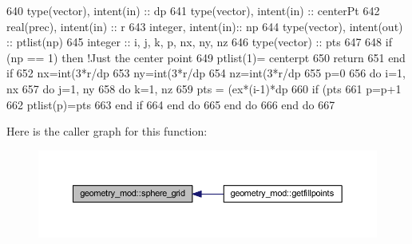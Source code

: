 \begin{DoxyCode}
640     \textcolor{keywordtype}{type}(vector), \textcolor{keywordtype}{intent(in)} :: dp
641     \textcolor{keywordtype}{type}(vector), \textcolor{keywordtype}{intent(in)} :: centerPt
642     \textcolor{keywordtype}{real(prec)}, \textcolor{keywordtype}{intent(in)} :: r
643     \textcolor{keywordtype}{integer}, \textcolor{keywordtype}{intent(in)}::  np
644     \textcolor{keywordtype}{type}(vector), \textcolor{keywordtype}{intent(out)} :: ptlist(np)
645     \textcolor{keywordtype}{integer} :: i, j, k, p, nx, ny, nz
646     \textcolor{keywordtype}{type}(vector) :: pts
647 
648     \textcolor{keywordflow}{if} (np == 1) \textcolor{keywordflow}{then} \textcolor{comment}{!Just the center point}
649         ptlist(1)= centerpt
650         \textcolor{keywordflow}{return}
651 \textcolor{keywordflow}{    end if}
652     nx=int(3*r/dp%
653     ny=int(3*r/dp%
654     nz=int(3*r/dp%
655     p=0
656     \textcolor{keywordflow}{do} i=1, nx
657         \textcolor{keywordflow}{do} j=1, ny
658             \textcolor{keywordflow}{do} k=1, nz
659                 pts = (ex*(i-1)*dp%
660                 \textcolor{keywordflow}{if} (pts%
661                     p=p+1
662                     ptlist(p)=pts
663 \textcolor{keywordflow}{                end if}
664 \textcolor{keywordflow}{            end do}
665 \textcolor{keywordflow}{        end do}
666 \textcolor{keywordflow}{    end do}
667 
\end{DoxyCode}
Here is the caller graph for this function\+:\nopagebreak
\begin{figure}[H]
\begin{center}
\leavevmode
\includegraphics[width=350pt]{namespacegeometry__mod_a9b4ea4b26bc4f50dbfa3ba8b1d3fb2f2_icgraph}
\end{center}
\end{figure}
\mbox{\label{namespacegeometry__mod_a05de7940b4e7df5a2b31f3d0414e3743}} 
